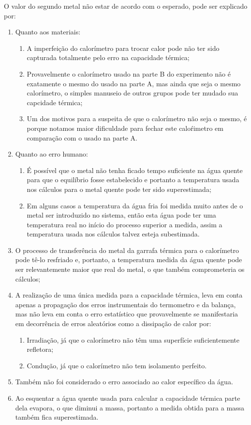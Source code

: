 \documentclass[a4paper]{article}
\begin{document}
		O valor do segundo metal não estar de acordo com o esperado, pode
		ser explicado por: 
		\begin{enumerate}
			\item Quanto aos materiais: 
				\begin{enumerate}
					\item A imperfeição do calorímetro para trocar calor pode não ter sido capturada
					totalmente pelo erro na capacidade térmica; 
					\item Provavelmente o calorímetro usado na parte B do experimento não é
					exatamente o mesmo do usado na parte A, mas ainda que seja o mesmo
					calorímetro, o simples manuseio de outros grupos pode ter mudado sua
					capcidade térmica; 
					\item Um dos motivos para a suspeita de que o calorímetro não seja o mesmo,
					é porque notamos maior dificuldade para fechar este calo\'{r}imetro
					em comparação com o usado na parte A. 
				\end{enumerate}
			\item Quanto ao erro humano: 
				\begin{enumerate}
					\item É possível que o metal não tenha ficado tempo suficiente na água quente
					para que o equilíbrio fosse estabelecido e portanto a temperatura
					usada nos cálculos para o metal quente pode ter sido superestimada; 
					\item Em alguns casos a temperatura da água fria foi medida muito antes
					de o metal ser introduzido no sistema, então esta água pode ter uma
					temperatura real no início do processo superior a medida, assim a
					temperatura usada nos cálculos talvez esteja subestimada. 
				\end{enumerate}
			\item O processo de transferência do metal da garrafa térmica para o calorímetro
			pode tê-lo resfriado e, portanto, a temperatura medida da água quente
			pode ser relevantemente maior que real do metal, o que também comprometeria
			os cálculos; 
			\item A realização de uma única medida para a capacidade térmica, leva em
			conta apenas a propagação dos erros instrumentais do termometro e
			da balança, mas não leva em conta o erro estatístico que provavelmente
			se manifestaria em decorrência de erros aleatórios como a dissipação
			de calor por: 
				\begin{enumerate}
					\item Irradiação, já que o calorímetro não têm uma superfície suficientemente
					refletora; 
					\item Condução, já que o calorímetro não tem isolamento perfeito. 
				\end{enumerate}
			\item Também não foi considerado o erro associado ao calor específico da
			água. 
			\item Ao esquentar a água quente usada para calcular a capacidade térmica
			parte dela evapora, o que diminui a massa, portanto a medida obtida
			para a massa também fica superestimada. 
		\end{enumerate}
\end{document}
